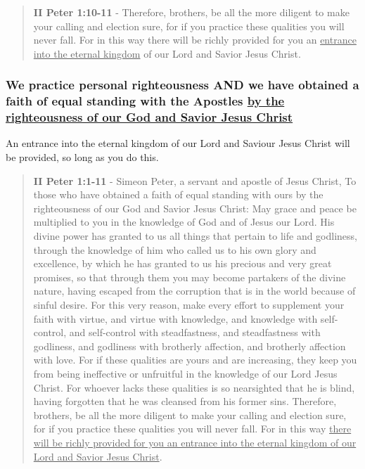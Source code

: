 \documentclass[11pt]{article}
\begin{document}
\begin{quote}
\textbf{II Peter 1:10-11} - Therefore, brothers, be all the more diligent to make your calling and election sure, for if you practice these qualities you will never fall. For in this way there will be richly provided for you an \uline{entrance into the eternal kingdom} of our Lord and Savior Jesus Christ.
\end{quote}

\subsubsection{We practice personal righteousness AND we have obtained a faith of equal standing with the Apostles \underline{by the righteousness of our God and Savior Jesus Christ}}
\label{sec:org4fa41e8}
An entrance into the eternal kingdom of our Lord and Saviour Jesus Christ will
be provided, so long as you do this.

\begin{quote}
\textbf{II Peter 1:1-11} - Simeon Peter, a servant and apostle of Jesus Christ, To those who have obtained a faith of equal standing with ours by the righteousness of our God and Savior Jesus Christ: May grace and peace be multiplied to you in the knowledge of God and of Jesus our Lord.  His divine power has granted to us all things that pertain to life and godliness, through the knowledge of him who called us to his own glory and excellence, by which he has granted to us his precious and very great promises, so that through them you may become partakers of the divine nature, having escaped from the corruption that is in the world because of sinful desire.  For this very reason, make every effort to supplement your faith with virtue, and virtue with knowledge, and knowledge with self-control, and self-control with steadfastness, and steadfastness with godliness, and godliness with brotherly affection, and brotherly affection with love.  For if these qualities are yours and are increasing, they keep you from being ineffective or unfruitful in the knowledge of our Lord Jesus Christ.  For whoever lacks these qualities is so nearsighted that he is blind, having forgotten that he was cleansed from his former sins.  Therefore, brothers, be all the more diligent to make your calling and election sure, for if you practice these qualities you will never fall.  For in this way \uline{there will be richly provided for you an entrance into the eternal kingdom of our Lord and Savior Jesus Christ}.
\end{quote}
\end{document}
